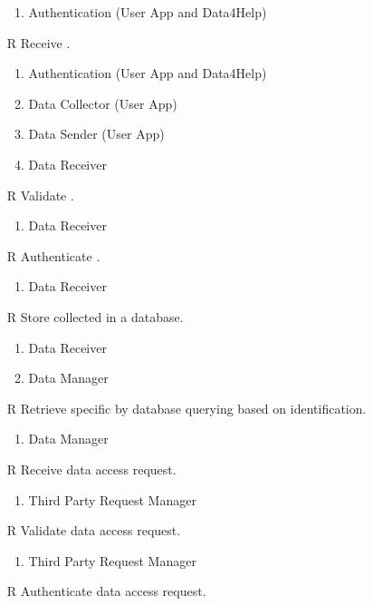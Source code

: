 \begin{itemize}
	\begin{enumerate}
		\item Authentication (User App and Data4Help)
	\end{enumerate}
	\item[R\subs{8}]Receive .
	\begin{enumerate}
		\item Authentication (User App and Data4Help)
		\item Data Collector (User App)
		\item Data Sender (User App)
		\item Data Receiver
	\end{enumerate}
	\item[R\subs{9}]Validate .
	\begin{enumerate}
		\item Data Receiver
	\end{enumerate}
	\item[R\subs{10}]Authenticate .
	\begin{enumerate}
		\item Data Receiver
	\end{enumerate}
	\item[R\subs{11}]Store collected  in a database.
	\begin{enumerate}
		\item Data Receiver
		\item Data Manager
	\end{enumerate}
	\item[R\subs{12}]Retrieve specific  by database querying based on  identification.
	\begin{enumerate}
		\item Data Manager
	\end{enumerate}
	\item[R\subs{13}]Receive  data access request.
	\begin{enumerate}
		\item Third Party Request Manager
	\end{enumerate}
	\item[R\subs{14}]Validate  data access request.
	\begin{enumerate}
		\item Third Party Request Manager
	\end{enumerate}
	\item[R\subs{15}]Authenticate  data access request.
	\begin{enumerate}

\end{enumerate}
\end{itemize}
